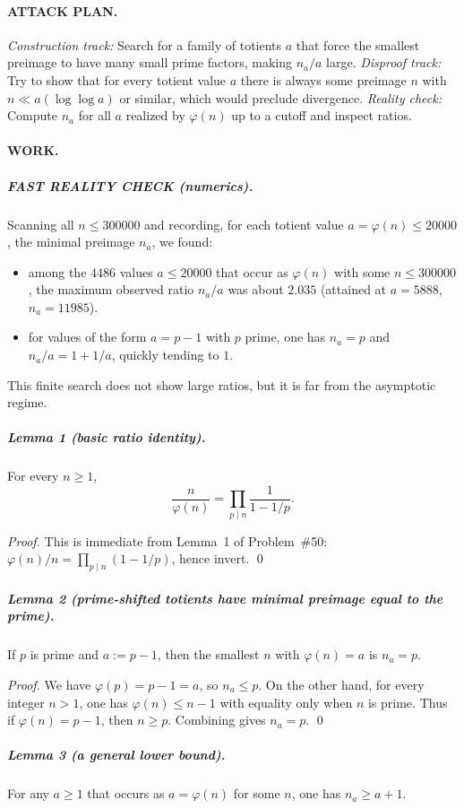 \paragraph{ATTACK PLAN.}
\emph{Construction track:} Search for a family of totients $a$ that force the smallest preimage to have many small prime factors, making $n_a/a$ large.
\emph{Disproof track:} Try to show that for every totient value $a$ there is always some preimage $n$ with $n\ll a(\log\log a)$ or similar, which would preclude divergence.
\emph{Reality check:} Compute $n_a$ for all $a$ realized by $\varphi(n)$ up to a cutoff and inspect ratios.

\paragraph{WORK.}
\subparagraph{FAST REALITY CHECK (numerics).}
Scanning all $n\le 300000$ and recording, for each totient value $a=\varphi(n)\le 20000$, the minimal preimage $n_a$, we found:
\begin{itemize}
\item among the $4486$ values $a\le 20000$ that occur as $\varphi(n)$ with some $n\le 300000$, the maximum observed ratio $n_a/a$ was about $2.035$ (attained at $a=5888$, $n_a=11985$).
\item for values of the form $a=p-1$ with $p$ prime, one has $n_a=p$ and $n_a/a=1+1/a$, quickly tending to $1$.
\end{itemize}
This finite search does not show large ratios, but it is far from the asymptotic regime.

\subparagraph{Lemma 1 (basic ratio identity).}
For every $n\ge 1$,
\[
\frac{n}{\varphi(n)}=\prod_{p\mid n}\frac{1}{1-1/p}.
\]

\emph{Proof.}
This is immediate from Lemma~1 of Problem~\#50: $\varphi(n)/n=\prod_{p\mid n}(1-1/p)$, hence invert. \qed

\subparagraph{Lemma 2 (prime-shifted totients have minimal preimage equal to the prime).}
If $p$ is prime and $a:=p-1$, then the smallest $n$ with $\varphi(n)=a$ is $n_a=p$.

\emph{Proof.}
We have $\varphi(p)=p-1=a$, so $n_a\le p$.
On the other hand, for every integer $n>1$, one has $\varphi(n)\le n-1$ with equality only when $n$ is prime.
Thus if $\varphi(n)=p-1$, then $n\ge p$.
Combining gives $n_a=p$. \qed

\subparagraph{Lemma 3 (a general lower bound).}
For any $a\ge 1$ that occurs as $a=\varphi(n)$ for some $n$, one has $n_a\ge a+1$.

